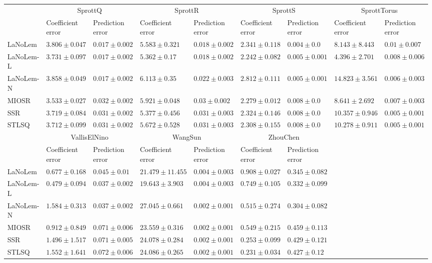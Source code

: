 \begin{table*}
{\begin{tabular}{lllllllll}
 & \multicolumn{2}{c}{SprottQ} & \multicolumn{2}{c}{SprottR} & \multicolumn{2}{c}{SprottS} & \multicolumn{2}{c}{SprottTorus} \\
 & Coefficient error & Prediction error & Coefficient error & Prediction error & Coefficient error & Prediction error & Coefficient error & Prediction error \\
\midrule
LaNoLem & $3.806\pm 0.047$ & $\mathbf{0.017}\pm 0.002$ & $5.583\pm 0.321$ & $\mathbf{0.018}\pm 0.002$ & $2.341\pm 0.118$ & $\mathbf{0.004}\pm 0.0$ & $8.143\pm 8.443$ & $0.01\pm 0.007$ \\
LaNoLem-L & $3.731\pm 0.097$ & $0.017\pm 0.002$ & $\mathbf{5.362}\pm 0.17$ & $0.018\pm 0.002$ & $\mathbf{2.242}\pm 0.082$ & $0.005\pm 0.001$ & $\mathbf{4.396}\pm 2.701$ & $0.008\pm 0.006$ \\
LaNoLem-N & $3.858\pm 0.049$ & $0.017\pm 0.002$ & $6.113\pm 0.35$ & $0.022\pm 0.003$ & $2.812\pm 0.111$ & $0.005\pm 0.001$ & $14.823\pm 3.561$ & $0.006\pm 0.003$ \\
MIOSR & $\mathbf{3.533}\pm 0.027$ & $0.032\pm 0.002$ & $5.921\pm 0.048$ & $0.03\pm 0.002$ & $2.279\pm 0.012$ & $0.008\pm 0.0$ & $8.641\pm 2.692$ & $0.007\pm 0.003$ \\
SSR & $3.719\pm 0.084$ & $0.031\pm 0.002$ & $5.377\pm 0.456$ & $0.031\pm 0.003$ & $2.324\pm 0.146$ & $0.008\pm 0.0$ & $10.357\pm 0.946$ & $0.005\pm 0.001$ \\
STLSQ & $3.712\pm 0.099$ & $0.031\pm 0.002$ & $5.672\pm 0.528$ & $0.031\pm 0.003$ & $2.308\pm 0.155$ & $0.008\pm 0.0$ & $10.278\pm 0.911$ & $\mathbf{0.005}\pm 0.001$ \\

\midrule

 & \multicolumn{2}{c}{VallisElNino} & \multicolumn{2}{c}{WangSun} & \multicolumn{2}{c}{ZhouChen} \\
 & Coefficient error & Prediction error & Coefficient error & Prediction error & Coefficient error & Prediction error \\
\midrule
LaNoLem & $0.677\pm 0.168$ & $0.045\pm 0.01$ & $21.479\pm 11.455$ & $0.004\pm 0.003$ & $0.908\pm 0.027$ & $0.345\pm 0.082$ \\
LaNoLem-L & $\mathbf{0.479}\pm 0.094$ & $\mathbf{0.037}\pm 0.002$ & $\mathbf{19.643}\pm 3.903$ & $0.004\pm 0.003$ & $0.749\pm 0.105$ & $0.332\pm 0.099$ \\
LaNoLem-N & $1.584\pm 0.313$ & $0.037\pm 0.002$ & $27.045\pm 0.661$ & $0.002\pm 0.001$ & $0.515\pm 0.274$ & $\mathbf{0.304}\pm 0.082$ \\
MIOSR & $0.912\pm 0.849$ & $0.071\pm 0.006$ & $23.559\pm 0.316$ & $0.002\pm 0.001$ & $0.549\pm 0.215$ & $0.459\pm 0.113$ \\
SSR & $1.496\pm 1.517$ & $0.071\pm 0.005$ & $24.078\pm 0.284$ & $0.002\pm 0.001$ & $0.253\pm 0.099$ & $0.429\pm 0.121$ \\
STLSQ & $1.552\pm 1.641$ & $0.072\pm 0.006$ & $24.086\pm 0.265$ & $\mathbf{0.002}\pm 0.001$ & $\mathbf{0.231}\pm 0.034$ & $0.427\pm 0.12$ \\

\bottomrule
\end{tabular}
}
\end{table*}

